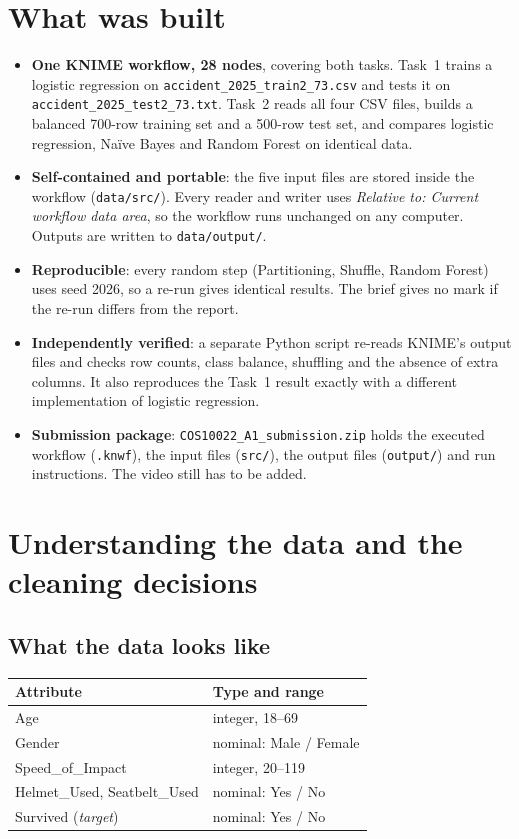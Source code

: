 \documentclass[11pt,a4paper]{article}
\newcommand{\cd}[1]{\texttt{#1}}                     %
\begin{document}
\section{What was built}
\begin{itemize}
  \item \textbf{One KNIME workflow, 28 nodes}, covering both tasks. Task~1 trains a logistic regression on
        \cd{accident\_2025\_train2\_73.csv} and tests it on \cd{accident\_2025\_test2\_73.txt}. Task~2 reads all four
        CSV files, builds a balanced 700-row training set and a 500-row test set, and compares logistic
        regression, Naïve Bayes and Random Forest on identical data.
  \item \textbf{Self-contained and portable}: the five input files are stored inside the workflow
        (\cd{data/src/}). Every reader and writer uses \emph{Relative to: Current workflow data area}, so the
        workflow runs unchanged on any computer. Outputs are written to \cd{data/output/}.
  \item \textbf{Reproducible}: every random step (Partitioning, Shuffle, Random Forest) uses seed 2026, so a re-run gives
        identical results. The brief gives no mark if the re-run differs from the report.
  \item \textbf{Independently verified}: a separate Python script re-reads KNIME's output files and checks row counts,
        class balance, shuffling and the absence of extra columns. It also reproduces the Task~1 result
        exactly with a different implementation of logistic regression.
  \item \textbf{Submission package}: \cd{COS10022\_A1\_submission.zip} holds the executed workflow (\cd{.knwf}), the
        input files (\cd{src/}), the output files (\cd{output/}) and run instructions. The video still has to be added.
\end{itemize}

\section{Understanding the data and the cleaning decisions}

\subsection{What the data looks like}
\begin{tabularx}{\linewidth}{@{}lL@{}}
\toprule
Attribute & Type and range \\ \midrule
Age & integer, 18--69 \\
Gender & nominal: Male / Female \\
Speed\_of\_Impact & integer, 20--119 \\
Helmet\_Used, Seatbelt\_Used & nominal: Yes / No \\
Survived (\emph{target}) & nominal: Yes / No \\ \bottomrule
\end{tabularx}
\end{document}
